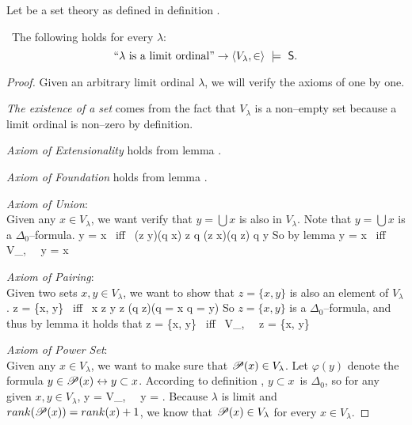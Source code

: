 Let  be a set theory as defined in definition . 
\begin{lemma}\label{lemma:scm_s_is_limit}\
The following holds for every $\lambda$:
\begin{equation}
\mbox{``$\lambda$ is a limit ordinal''} \rightarrow \langle V_\lambda, \in \rangle~\models~\sf{S}\mbox{.}
\end{equation}
\end{lemma}

\begin{proof}
Given an arbitrary limit ordinal $\lambda$, we will verify the axioms of  one by one.
\bce[(i)]
\item \emph{The existence of a set} comes from the fact that $V_\lambda$ is a non–empty set because a limit ordinal is non–zero by definition.

\item \emph{\emph{Axiom of Extensionality}} holds from lemma .

\item \emph{Axiom of Foundation} holds from lemma .

\item \emph{Axiom of Union}:\\
Given any $x \in V_\lambda$, we want verify that $y = \bigcup x$ is also in $V_\lambda$. Note that $y = \bigcup x$ is a $\Delta_0$–formula.
\beq
y = \bigcup x \mbox{ iff } (\forall z \in y)(\exists q \in x) z \in q \et (\forall z \in x)(\forall q \in z) q \in y
\eeq
So by lemma 
\beq
y = \bigcup x \mbox{ iff } \langle V_\lambda, \in \rangle~\models~y = \bigcup x
\eeq

\item \emph{Axiom of Pairing}: \\
Given two sets $x, y \in V_\lambda$, we want to show that $z = \{x, y\}$ is also an element of $V_\lambda$.
\beq
z = \{x, y\} \mbox{ iff } x \in z \et y \in z \et (\forall q \in z)(q = x \lor q = y)
\eeq
So $z = \{x, y\}$ is a $\Delta_0$–formula, and thus by lemma  it holds that
\beq
z = \{x, y\} \mbox{ iff } \langle V_\lambda, \in \rangle~\models~z = \{x, y\}
\eeq


\item \emph{Axiom of Power Set}: \\
Given any $x \in V_\lambda$, we want to make sure that $\mathscr{P} (x) \in V_\lambda$. Let $\varphi(y)$ denote the formula $y \in \mathscr{P} (x) \leftrightarrow y \subset x$.
According to definition \bref{def:subset}, $y \subset x$ is $\Delta_0$, so for any given $x, y \in V_\lambda$,
\beq
y =  \iff \langle V_\lambda, \in \rangle~\models~y = \mbox{.}
\eeq
Because $\lambda$ is limit and $rank(\mathscr{P} (x)) = rank(x)+1$, we know that $\mathscr{P} (x) \in V_\lambda$ for every $x \in V_\lambda$.


\end{proof}
